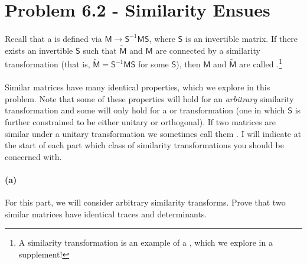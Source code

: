 \documentclass{article}
\begin{document}
\bigskip
\dphline
\pagebreak
\section*{Problem 6.2 - Similarity Ensues}

\paragraph{}
Recall that a  is defined via $\mathsf{M}\to \mathsf{S}^{-1}\mathsf{MS}$, where $\mathsf{S}$ is an invertible matrix.
If there exists an invertible $\mathsf{S}$ such that $\widetilde{\mathsf{M}}$ and $\mathsf{M}$ are connected by a similarity transformation 
(that is, $\widetilde{\mathsf{M}} = \mathsf{S}^{-1}\mathsf{MS}$ for some $\mathsf{S}$), then $\mathsf{M}$ and $\widetilde{\mathsf{M}}$
are called .\footnote{A similarity transformation is an example of a , which we explore in a supplement!}

\paragraph{}
Similar matrices have many identical properties, which we explore in this problem.  Note that some of these properties
will hold for an \emph{arbitrary} similarity transformation and some will only hold for a  or  transformation (one in which
$\mathsf{S}$ is further constrained to be either unitary or orthogonal).  If two matrices are similar under a unitary transformation we sometimes call them 
.  I will indicate at the start of each part which class of similarity transformations you should be concerned with.

\phline
\paragraph{(a)}
For this part, we will consider arbitrary similarity transforms.  Prove that two similar matrices have identical traces and determinants.
\end{document}
